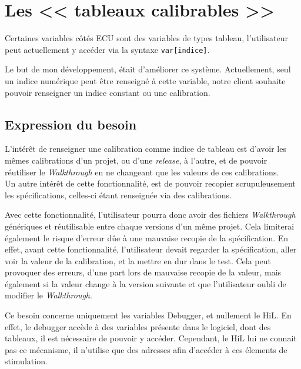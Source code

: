 \section{Les << tableaux calibrables >>}
Certaines variables côtés ECU sont des variables de types tableau, l’utilisateur peut actuellement y accéder via la syntaxe \texttt{var[indice]}.

Le but de mon développement, était d’améliorer ce système. Actuellement, seul un indice numérique peut être renseigné à cette variable, notre client souhaite pouvoir renseigner un indice constant ou une calibration.

\subsection{Expression du besoin}\label{besoinTab}
L'intérêt de renseigner une calibration comme indice de tableau est d’avoir les mêmes calibrations d’un projet, ou d'une \textit{release}, à l’autre, et de pouvoir réutiliser le \textit{Walkthrough} en ne changeant que les valeurs de ces calibrations.\\
Un autre intérêt de cette fonctionnalité, est de pouvoir recopier scrupuleusement les spécifications, celles-ci étant renseignée via des calibrations.

Avec cette fonctionnalité, l'utilisateur pourra donc avoir des fichiers \textit{Walkthrough} génériques et réutilisable entre chaque versions d'un même projet. Cela limiterai également le risque d'erreur dûe à une mauvaise recopie de la spécification. En effet, avant cette fonctionnalité, l'utilisateur devait regarder la spécification, aller voir la valeur de la calibration, et la mettre en dur dans le test. Cela peut provoquer des erreurs, d'une part lors de mauvaise recopie de la valeur, mais également si la valeur change à la version suivante et que l'utilisateur oubli de modifier le \textit{Walkthrough}.

Ce besoin concerne uniquement les variables Debugger, et nullement le HiL. En effet, le debugger accède à des variables présente dans le logiciel, dont des tableaux, il est nécessaire de pouvoir y accéder. Cependant, le HiL lui ne connait pas ce mécanisme, il n'utilise que des adresses afin d'accéder à ces élements de stimulation.


